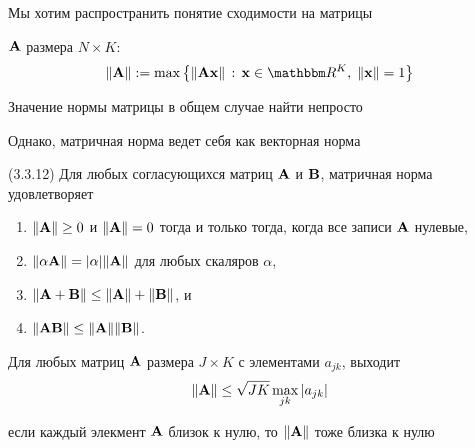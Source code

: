 \begin{frame}

    \vspace{2em}
    Мы хотим распространить понятие сходимости на матрицы
    
    \vspace{.7em}
     $\mathbf A$ размера $N \times K$:
    \begin{equation}
    \label{eq:mn}
    \| \boldA \| :=
    \max \left\{ 
        \| \boldA \boldx \| \,: \, 
        \boldx \in \RR^K, \; \| \boldx \| = 1
        \right\}
    \end{equation}

    \vspace{.7em}
    Значение нормы матрицы в общем случае найти непросто
    
    Однако, матричная норма ведет себя как векторная норма
    
\end{frame}

\begin{frame}

    \vspace{2em}
    \Fact (3.3.12)
    Для любых согласующихся матриц $\mathbf A$ и $\mathbf B$, матричная норма удовлетворяет
    \begin{enumerate}
        \item $\| \mathbf A \| \geq 0$ и $\| \mathbf A \| = 0$ тогда и только тогда, когда 
        все записи $\mathbf A$ нулевые,
        \item $\| \alpha \mathbf A \| = |\alpha| \| \mathbf A \|$ для любых скаляров
            $\alpha$,
        \item $\| \mathbf A + \mathbf B \| \leq \| \mathbf A \| + \| \mathbf B \|$, и
        \item $\| \mathbf A \mathbf B \| \leq \| \mathbf A \| \| \mathbf B \|$.
    \end{enumerate}
    
    
\end{frame}

\begin{frame}

    \vspace{2em}
    \Fact{\eqref{ET-fa:mnbd}}
    Для любых матриц $\mathbf A$ размера $J \times K$ с элементами $a_{jk}$, выходит
    \begin{equation*}
        \| \mathbf A \| \leq \sqrt{JK} \max_{jk} |a_{jk}|
    \end{equation*}
    
    \vspace{1em}
    если каждый элекмент
    $\mathbf A$ близок к нулю, то $\| \mathbf A \|$ тоже близка к нулю

\end{frame}

